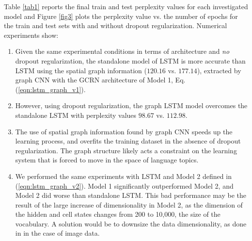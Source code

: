 \documentclass{article} %
\newcommand{\eqnref}[1]{(\ref{eqn:#1})}
\begin{document}
Table \ref{tab1} reports the final train and test perplexity values for each
investigated model and Figure \ref{fig3} plots the perplexity value vs. the
number of epochs for the train and test sets with and without dropout
regularization. Numerical experiments show:
\begin{enumerate}
\item Given the same experimental conditions in terms of architecture and {\it
	no} dropout regularization, the standalone model of LSTM is more accurate
	than LSTM using the spatial graph information ($120.16$ vs. $177.14$),
	extracted by graph CNN with the GCRN architecture of Model 1, Eq.
	\eqnref{lstm_graph_v1}. 
\item However, using dropout regularization, the graph LSTM model overcomes the
	standalone LSTM with perplexity values $98.67$ vs. $112.98$. 
\item The use of spatial graph information found by graph CNN speeds up the
	learning process, and overfits the training dataset in the absence of
	dropout regularization. The graph structure likely acts a constraint on the
	learning system that is forced to move in the space of language topics.
\item We performed the same experiments with LSTM and Model 2 defined in
	\eqnref{lstm_graph_v2}. Model 1 significantly outperformed Model 2, and
	Model 2 did worse than standalone LSTM. This bad performance may be the
	result of the large increase of dimensionality in Model 2, as the dimension
	of the hidden and cell states changes from 200 to 10,000, the size of the
	vocabulary. A solution would be to downsize the data dimensionality, as
	done in \cite{convlstm} in the case of image data.
\end{enumerate}

\end{document}
